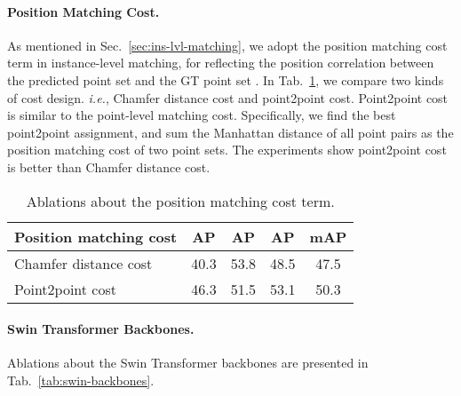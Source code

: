 \documentclass{article} \usepackage{iclr2023_conference,times}
\def\ie{\emph{i.e.}} \def\Ie{\emph{I.e.}}
\begin{document}
\paragraph{Position Matching Cost.}
As mentioned in Sec.~\ref{sec:ins-lvl-matching}, we adopt the position matching cost term  in instance-level matching, for reflecting the position correlation between the predicted point set  and the GT point set . 
In Tab.~\ref{tab:position-matching-cost}, we compare two kinds of cost design. \ie, Chamfer distance cost and point2point cost. 
Point2point cost is similar to the point-level matching cost. Specifically, we find the best point2point assignment, and sum the Manhattan distance of all point pairs as the  position matching cost of two point sets.
The experiments show point2point cost is better than Chamfer distance cost.
\begin{table}[ht!]
\begin{center}
\begin{tabular}{l|ccc|c}
\hline
\rowcolor{Gray}
Position matching cost& AP & AP & AP &mAP\\
\toprule
Chamfer distance cost & 40.3 & 53.8 & 48.5& 47.5 \\
Point2point cost  &\cellcolor{blue!10}46.3&\cellcolor{blue!10}51.5&\cellcolor{blue!10}53.1&\cellcolor{blue!10}50.3\\
\bottomrule
\end{tabular}
\end{center}
\vspace*{-0.45cm}
\caption{Ablations about the position matching cost term.}
\label{tab:position-matching-cost}
\vspace*{-0.35cm}
\end{table}

\paragraph{Swin Transformer Backbones.} Ablations about the Swin Transformer backbones \citep{swin} are presented in Tab.~\ref{tab:swin-backbones}. 
\end{document}
